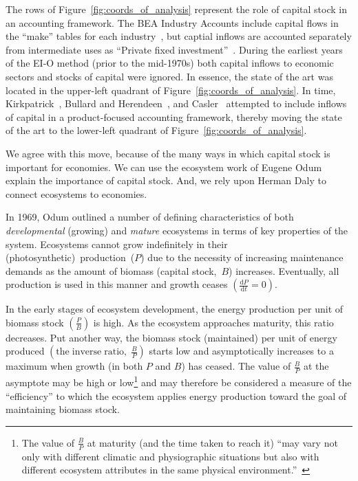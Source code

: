 The rows of Figure~\ref{fig:coords_of_analysis}
represent the role of capital stock in an accounting framework.
The BEA Industry Accounts include capital flows in the ``make''
tables for each industry~\cite[Table~1]{Streitwieser:2011aa}, 
but captial inflows are accounted separately 
from intermediate uses as 
``Private fixed invest­ment''~\cite[Table~2]{Streitwieser:2011aa}.
During the earliest years of the EI-O method 
(prior to the mid-1970s) 
both capital inflows to economic sectors 
and stocks of capital were ignored.
In essence, the state of the art was located in the upper-left quadrant
of Figure~\ref{fig:coords_of_analysis}.
In time, Kirkpatrick~\cite{Kirkpatrick:1974te}, 
Bullard and Herendeen~\cite{Bullard-III:1975aa},
and Casler~\cite{Casler:1983uy} attempted to 
include inflows of capital in a product-focused
accounting framework, thereby moving the state of the art 
to the lower-left quadrant of Figure~\ref{fig:coords_of_analysis}.

We agree with this move, because of the many ways in which
capital stock is important for economies.
We can use the ecosystem work of Eugene Odum 
explain the importance of capital stock.
And, we rely upon Herman Daly to connect
ecosystems to economies.

In 1969, Odum outlined a number of 
defining characteristics of both \emph{developmental}
(growing) and \emph{mature} ecosystems in terms of key
properties of the system.\cite{Odum1969}
Ecosystems cannot
grow indefinitely in their (photosynthetic)~production~($P$)
due to the necessity of increasing maintenance
demands as the amount of biomass (capital
stock,~$B$) increases.
Eventually, all production is used in this manner
and growth ceases 
$\left(\frac{\mathrm{d}P}{\mathrm{d}t} = 0\right)$.

In the early stages of ecosystem development,
the energy production per unit of biomass stock $\left( \frac{P}{B} \right)$
is high.
As the ecosystem approaches maturity,
this ratio decreases.
Put another way,
the biomass stock (maintained) per unit of energy produced
$\left( \mathrm{the \; inverse \; ratio, \;} \frac{B}{P} \right)$
starts low and asymptotically increases to a maximum
when growth (in both $P$ and $B$) has ceased. 
The value of $\frac{B}{P}$ at the asymptote may be high or low\footnote{The
	value of $\frac{B}{P}$ at maturity (and the time taken to reach it)
	``may vary not only with different climatic 
	and physiographic situations but also with
	different ecosystem attributes in the same physical 
	environment.''~\cite[p.263]{Odum1969}}
and may therefore be considered a measure of 
the ``efficiency'' to which the ecosystem applies
energy production toward
the goal of maintaining biomass stock.
 

